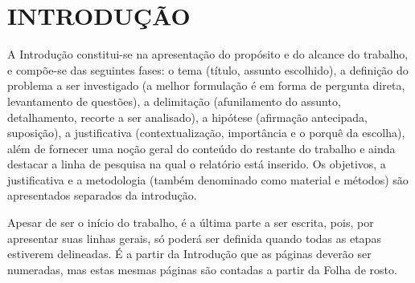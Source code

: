 \chapter{INTRODUÇÃO}

A Introdução constitui-se na apresentação do propósito e do alcance do trabalho, e compõe-se das seguintes fases: o tema (título, assunto escolhido), a definição do problema a ser investigado (a melhor formulação é em forma de pergunta direta, levantamento de questões), a delimitação (afunilamento do assunto, detalhamento, recorte a ser analisado), a hipótese (afirmação antecipada, suposição), a justificativa (contextualização, importância e o porquê da escolha), além de fornecer uma noção geral do conteúdo do restante do trabalho e ainda destacar a linha de pesquisa na qual o relatório está inserido. 
Os objetivos, a justificativa e a metodologia (também denominado como material e métodos) são apresentados separados da introdução.

Apesar de ser o início do trabalho, é a última parte a ser escrita, pois, por apresentar suas linhas gerais, só poderá ser definida quando todas as etapas estiverem delineadas. É a partir da Introdução que as páginas deverão ser numeradas, mas estas mesmas páginas são contadas a partir da Folha de rosto.

